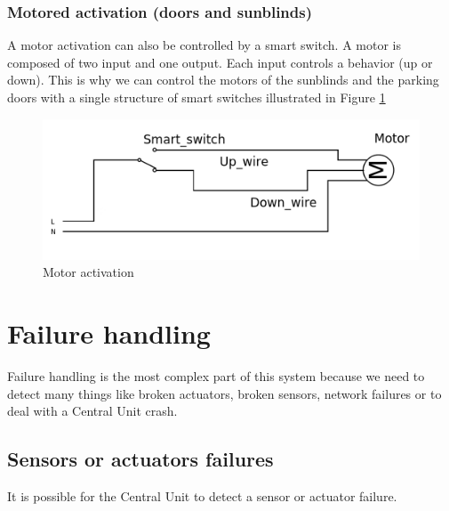 \documentclass{acm_proc_article-sp}
\begin{document}
\subsubsection{Motored activation (doors and sunblinds)}
A motor activation can also be controlled by a smart switch.
A motor is composed of two input and one output. Each input controls a behavior (up or down).
This is why we can control the motors of the sunblinds and the parking doors with a single structure of smart switches illustrated in Figure \ref{motor}
				\begin{figure}[htb]
  				\begin{center}
    				\includegraphics[width=\linewidth]{motor}
    				\caption{Motor activation \label{motor}}
  				\end{center}
				\end{figure}

\section{Failure handling}\label{failure_handling}
Failure handling is the most complex part of this system because we need to detect many things like broken actuators, broken sensors, 
network failures or to deal with a Central Unit crash.
\subsection{Sensors or actuators failures}
It is possible for the Central Unit to detect a sensor or actuator failure. 
\end{document}
